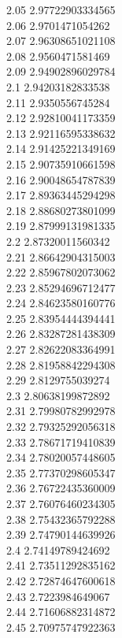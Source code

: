 {2.05	2.97722903334565\\
2.06	2.9701471054262\\
2.07	2.96308651021108\\
2.08	2.9560471581469\\
2.09	2.94902896029784\\
2.1	2.94203182833538\\
2.11	2.9350556745284\\
2.12	2.92810041173359\\
2.13	2.92116595338632\\
2.14	2.91425221349169\\
2.15	2.90735910661598\\
2.16	2.90048654787839\\
2.17	2.89363445294298\\
2.18	2.88680273801099\\
2.19	2.87999131981335\\
2.2	2.87320011560342\\
2.21	2.86642904315003\\
2.22	2.85967802073062\\
2.23	2.85294696712477\\
2.24	2.84623580160776\\
2.25	2.83954444394441\\
2.26	2.83287281438309\\
2.27	2.82622083364991\\
2.28	2.81958842294308\\
2.29	2.8129755039274\\
2.3	2.80638199872892\\
2.31	2.79980782992978\\
2.32	2.79325292056318\\
2.33	2.78671719410839\\
2.34	2.78020057448605\\
2.35	2.77370298605347\\
2.36	2.76722435360009\\
2.37	2.76076460234305\\
2.38	2.75432365792288\\
2.39	2.74790144639926\\
2.4	2.74149789424692\\
2.41	2.73511292835162\\
2.42	2.72874647600618\\
2.43	2.7223984649067\\
2.44	2.71606882314872\\
2.45	2.70975747922363\\
}
